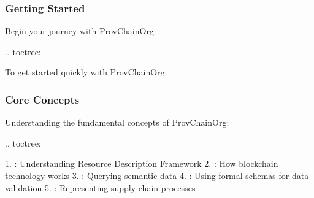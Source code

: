 \documentclass[letterpaper,10pt,english]{sphinxmanual}
\begin{document}
\subsubsection{Getting Started}
\label{\detokenize{user-guide/index:getting-started}}
\sphinxAtStartPar
Begin your journey with ProvChainOrg:

\sphinxAtStartPar
{}
.. toctree:

\begin{sphinxVerbatim}[commandchars=\\\{\}]
 
  

\end{sphinxVerbatim}

\sphinxAtStartPar
{}
To get started quickly with ProvChainOrg:


\subsubsection{Core Concepts}
\label{\detokenize{user-guide/index:core-concepts}}
\sphinxAtStartPar
Understanding the fundamental concepts of ProvChainOrg:

\sphinxAtStartPar
{}
.. toctree:

\begin{sphinxVerbatim}[commandchars=\\\{\}]
 
  

\end{sphinxVerbatim}

\sphinxAtStartPar
{}
1. : Understanding Resource Description Framework
2. : How blockchain technology works
3. : Querying semantic data
4. : Using formal schemas for data validation
5. : Representing supply chain processes
\end{document}
